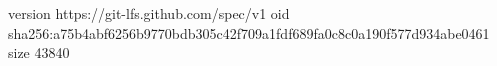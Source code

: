 version https://git-lfs.github.com/spec/v1
oid sha256:a75b4abf6256b9770bdb305c42f709a1fdf689fa0c8c0a190f577d934abe0461
size 43840
